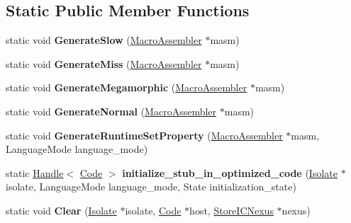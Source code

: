 \subsection*{Static Public Member Functions}
\begin{DoxyCompactItemize}
\item 
static void {\bfseries Generate\+Slow} (\hyperlink{classv8_1_1internal_1_1_macro_assembler}{Macro\+Assembler} $\ast$masm)\hypertarget{classv8_1_1internal_1_1_store_i_c_af95f39504c8dabaf02136fa77269fbb9}{}\label{classv8_1_1internal_1_1_store_i_c_af95f39504c8dabaf02136fa77269fbb9}

\item 
static void {\bfseries Generate\+Miss} (\hyperlink{classv8_1_1internal_1_1_macro_assembler}{Macro\+Assembler} $\ast$masm)\hypertarget{classv8_1_1internal_1_1_store_i_c_a2279582bb891a58e88531edc83e610d2}{}\label{classv8_1_1internal_1_1_store_i_c_a2279582bb891a58e88531edc83e610d2}

\item 
static void {\bfseries Generate\+Megamorphic} (\hyperlink{classv8_1_1internal_1_1_macro_assembler}{Macro\+Assembler} $\ast$masm)\hypertarget{classv8_1_1internal_1_1_store_i_c_a9c3bc2cdbaa4f91a75c4dd991ed801a8}{}\label{classv8_1_1internal_1_1_store_i_c_a9c3bc2cdbaa4f91a75c4dd991ed801a8}

\item 
static void {\bfseries Generate\+Normal} (\hyperlink{classv8_1_1internal_1_1_macro_assembler}{Macro\+Assembler} $\ast$masm)\hypertarget{classv8_1_1internal_1_1_store_i_c_ae7a0b1a7c350508c34030dc3bcc24c8f}{}\label{classv8_1_1internal_1_1_store_i_c_ae7a0b1a7c350508c34030dc3bcc24c8f}

\item 
static void {\bfseries Generate\+Runtime\+Set\+Property} (\hyperlink{classv8_1_1internal_1_1_macro_assembler}{Macro\+Assembler} $\ast$masm, Language\+Mode language\+\_\+mode)\hypertarget{classv8_1_1internal_1_1_store_i_c_a955df835fe56f48a05885fdc92966a63}{}\label{classv8_1_1internal_1_1_store_i_c_a955df835fe56f48a05885fdc92966a63}

\item 
static \hyperlink{classv8_1_1internal_1_1_handle}{Handle}$<$ \hyperlink{classv8_1_1internal_1_1_code}{Code} $>$ {\bfseries initialize\+\_\+stub\+\_\+in\+\_\+optimized\+\_\+code} (\hyperlink{classv8_1_1internal_1_1_isolate}{Isolate} $\ast$isolate, Language\+Mode language\+\_\+mode, State initialization\+\_\+state)\hypertarget{classv8_1_1internal_1_1_store_i_c_a35f89b17b4940ae32fe0652826ac8a36}{}\label{classv8_1_1internal_1_1_store_i_c_a35f89b17b4940ae32fe0652826ac8a36}

\item 
static void {\bfseries Clear} (\hyperlink{classv8_1_1internal_1_1_isolate}{Isolate} $\ast$isolate, \hyperlink{classv8_1_1internal_1_1_code}{Code} $\ast$host, \hyperlink{classv8_1_1internal_1_1_store_i_c_nexus}{Store\+I\+C\+Nexus} $\ast$nexus)\hypertarget{classv8_1_1internal_1_1_store_i_c_a5e5a37720bbf3d559c8b8869cb5c6171}{}\label{classv8_1_1internal_1_1_store_i_c_a5e5a37720bbf3d559c8b8869cb5c6171}

\end{DoxyCompactItemize}
